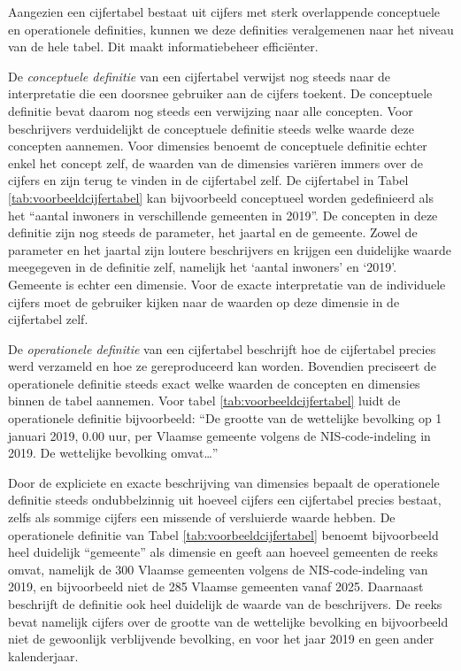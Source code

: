 \documentclass[\mainfiledir/00_handleiding_statistiekproductie.tex]{subfiles}
\begin{document}
Aangezien een cijfertabel bestaat uit cijfers met sterk overlappende conceptuele en operationele definities, kunnen we deze definities veralgemenen naar het niveau van de hele tabel. Dit maakt informatiebeheer efficiënter.
	
De \emph{conceptuele definitie} van een cijfertabel verwijst nog steeds naar de interpretatie die een doorsnee gebruiker aan de cijfers toekent. De conceptuele definitie bevat daarom nog steeds een verwijzing naar alle concepten. Voor beschrijvers verduidelijkt de conceptuele definitie steeds welke waarde deze concepten aannemen. Voor dimensies benoemt de conceptuele definitie echter enkel het concept zelf, de waarden van de dimensies variëren immers over de cijfers en zijn terug te vinden in de cijfertabel zelf. De cijfertabel in Tabel \ref{tab:voorbeeldcijfertabel} kan bijvoorbeeld conceptueel worden gedefinieerd als het ``aantal inwoners in verschillende gemeenten in 2019''.  De concepten in deze definitie zijn nog steeds de parameter, het jaartal en de gemeente. Zowel de parameter en het jaartal zijn loutere beschrijvers en krijgen een duidelijke waarde meegegeven in de definitie zelf, namelijk het `aantal inwoners' en `2019'. Gemeente is echter een dimensie. Voor de exacte interpretatie van de individuele cijfers moet de gebruiker kijken naar de waarden op deze dimensie in de cijfertabel zelf.

De \emph{operationele definitie} van een cijfertabel beschrijft hoe de cijfertabel precies werd verzameld en hoe ze gereproduceerd kan worden. Bovendien preciseert de operationele definitie steeds exact welke waarden de concepten en dimensies binnen de tabel aannemen. Voor tabel \ref{tab:voorbeeldcijfertabel} luidt de operationele definitie bijvoorbeeld: ``De grootte van de wettelijke bevolking op 1 januari 2019, 0.00 uur, per Vlaamse gemeente volgens de NIS‐code‐indeling in 2019. De wettelijke bevolking omvat\ldots'' 
	
Door de expliciete en exacte beschrijving van dimensies bepaalt de operationele definitie steeds ondubbelzinnig uit hoeveel cijfers een cijfertabel precies bestaat, zelfs als sommige cijfers een missende of versluierde waarde hebben. De operationele definitie van Tabel \ref{tab:voorbeeldcijfertabel} benoemt bijvoorbeeld heel duidelijk ``gemeente'' als dimensie en geeft aan hoeveel gemeenten de reeks omvat, namelijk de 300 Vlaamse gemeenten volgens de NIS‐code‐indeling van 2019, en bijvoorbeeld niet de 285 Vlaamse gemeenten vanaf 2025. Daarnaast beschrijft de definitie ook heel duidelijk de waarde van de beschrijvers. De reeks bevat namelijk cijfers over de grootte van de wettelijke bevolking en bijvoorbeeld niet de gewoonlijk verblijvende bevolking, en voor het jaar 2019 en geen ander kalenderjaar.
\end{document}
